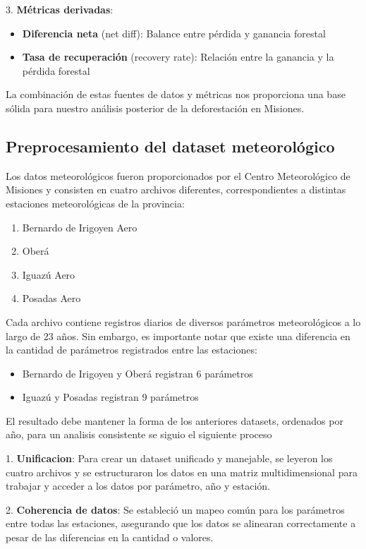 \documentclass[11pt]{article}
\begin{document}
3. \textbf{Métricas derivadas}:
   \begin{itemize}
       \item \textbf{Diferencia neta} (net diff): Balance entre pérdida y ganancia forestal
       \item \textbf{Tasa de recuperación} (recovery rate): Relación entre la ganancia y la pérdida forestal
   \end{itemize}

La combinación de estas fuentes de datos y métricas nos proporciona una base sólida para nuestro análisis posterior de la deforestación en Misiones.

\subsection{Preprocesamiento del dataset meteorológico}
Los datos meteorológicos fueron proporcionados por el Centro Meteorológico de Misiones y consisten en cuatro archivos diferentes, correspondientes a distintas estaciones meteorológicas de la provincia:

\begin{enumerate}
    \item Bernardo de Irigoyen Aero 
    \item Oberá
    \item Iguazú Aero
    \item Posadas Aero
\end{enumerate}

Cada archivo contiene registros diarios de diversos parámetros meteorológicos a lo largo de 23 años. Sin embargo, es importante notar que existe una diferencia en la cantidad de parámetros registrados entre las estaciones:

\begin{itemize}
    \item Bernardo de Irigoyen y Oberá registran 6 parámetros
    \item Iguazú y Posadas registran 9 parámetros
\end{itemize}

El resultado debe mantener la forma de los anteriores datasets, ordenados por año, para un analisis consistente se siguio el siguiente proceso

1. \textbf{Unificacion}: Para crear un dataset unificado y manejable, se leyeron los cuatro archivos y se estructuraron los datos en una matriz multidimensional para trabajar y acceder a los datos por parámetro, año y estación.

2. \textbf{Coherencia de datos}: Se estableció un mapeo común para los parámetros entre todas las estaciones, asegurando que los datos se alinearan correctamente a pesar de las diferencias en la cantidad o valores.
\end{document}
